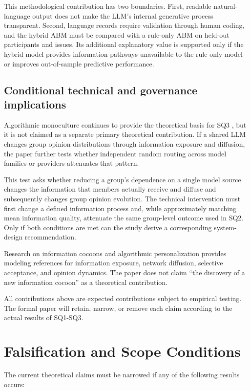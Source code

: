 \documentclass[11pt,a4paper]{article}
\begin{document}
This methodological contribution has two boundaries. First, readable natural-language output does not make the LLM's internal generative process transparent. Second, language records require validation through human coding, and the hybrid ABM must be compared with a rule-only ABM on held-out participants and issues. Its additional explanatory value is supported only if the hybrid model provides information pathways unavailable to the rule-only model or improves out-of-sample predictive performance.

\subsection{Conditional technical and governance implications}

Algorithmic monoculture continues to provide the theoretical basis for SQ3 \cite{kleinberg2021}, but it is not claimed as a separate primary theoretical contribution. If a shared LLM changes group opinion distributions through information exposure and diffusion, the paper further tests whether independent random routing across model families or providers attenuates that pattern.

This test asks whether reducing a group's dependence on a single model source changes the information that members actually receive and diffuse and subsequently changes group opinion evolution. The technical intervention must first change a defined information process and, while approximately matching mean information quality, attenuate the same group-level outcome used in SQ2. Only if both conditions are met can the study derive a corresponding system-design recommendation.

Research on information cocoons and algorithmic personalization provides modeling references for information exposure, network diffusion, selective acceptance, and opinion dynamics. The paper does not claim ``the discovery of a new information cocoon'' as a theoretical contribution.

All contributions above are expected contributions subject to empirical testing. The formal paper will retain, narrow, or remove each claim according to the actual results of SQ1-SQ3.

\section{Falsification and Scope Conditions}

The current theoretical claims must be narrowed if any of the following results occurs:
\end{document}
